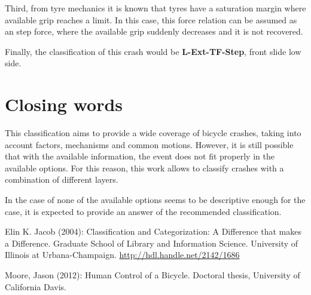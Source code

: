 \documentclass{article}
\begin{document}
Third, from tyre mechanics it is known that tyres have a saturation margin where available grip reaches a limit.
%
In this case, this force relation can be assumed as an step force, where the available grip suddenly decreases and it is not recovered.


Finally, the classification of this crash would be \textbf{L-Ext-TF-Step}, front slide low side.


\section{Closing words}

This classification aims to provide a wide coverage of bicycle crashes, taking into account factors, mechanisms and common motions.
%
However, it is still possible that with the available information, the event does not fit properly in the available options.
%
For this reason, this work allows to classify crashes with a combination of different layers.


In the case of none of the available options seems to be descriptive enough for the case, it is expected to provide an answer of the recommended classification.


\begin{thebibliography}{9}

     Elin K. Jacob (2004):  Classification and Categorization: A Difference that makes a Difference. Graduate School of Library and Information Science. University of Illinois at Urbana-Champaign. \url{http://hdl.handle.net/2142/1686}

     Moore, Jason (2012): Human Control of a Bicycle. Doctoral thesis, University of California Davis.


\end{thebibliography}
\end{document}
